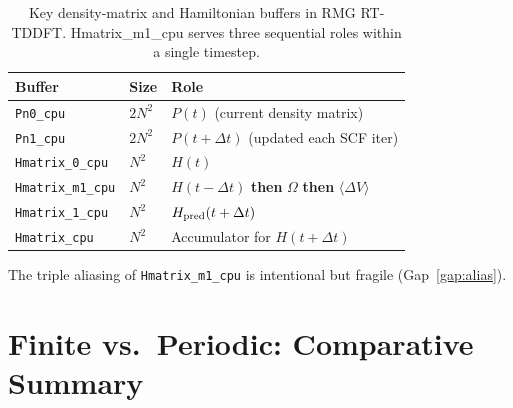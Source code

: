 \documentclass[12pt,letterpaper]{article}
\begin{document}
\begin{table}[ht]
\centering
\caption{Key density-matrix and Hamiltonian buffers in RMG RT-TDDFT.
  Hmatrix\_m1\_cpu serves three sequential roles within a single timestep.}
\label{tab:buffers}
\begin{tabular}{@{}lll@{}}
\toprule
Buffer & Size & Role \\
\midrule
\texttt{Pn0\_cpu} & $2N^2$ & $P(t)$ (current density matrix) \\
\texttt{Pn1\_cpu} & $2N^2$ & $P(t+\Delta t)$ (updated each SCF iter) \\
\texttt{Hmatrix\_0\_cpu} & $N^2$ & $H(t)$ \\
\texttt{Hmatrix\_m1\_cpu} & $N^2$ & $H(t-\Delta t)$ \textbf{then} $\Omega$ \textbf{then} $\langle\Delta V\rangle$ \\
\texttt{Hmatrix\_1\_cpu} & $N^2$ & $H_{\rm pred}(t+\Delta t)$ \\
\texttt{Hmatrix\_cpu} & $N^2$ & Accumulator for $H(t+\Delta t)$ \\
\bottomrule
\end{tabular}
\end{table}

The triple aliasing of \texttt{Hmatrix\_m1\_cpu} is intentional but fragile
(Gap~\ref{gap:alias}).

\section{Finite vs.\ Periodic: Comparative Summary}
\label{sec:comparison}
\end{document}
